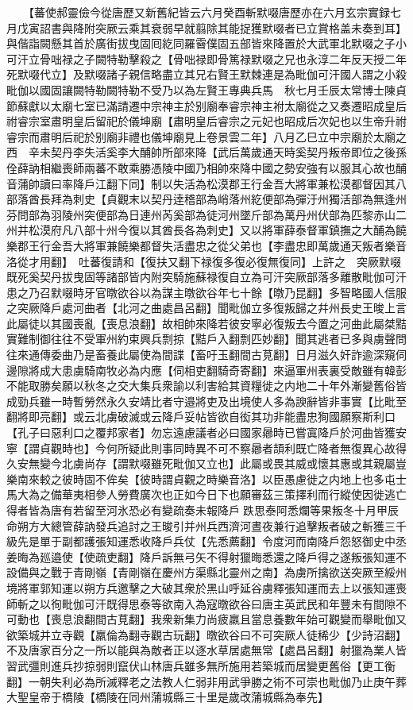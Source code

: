 　　【蕃使郝靈儉今從唐歷又新舊紀皆云六月癸酉斬默啜唐歷亦在六月玄宗實録七月戊寅詔書與降附突厥云乘其衰弱早就翦除其能捉獲默啜者已立賞格盖未奏到耳】與偕詣闕懸其首於廣街拔曳固囘紇同羅霫僕固五部皆來降置於大武軍北默啜之子小可汗立骨咄禄之子闕特勒擊殺之【骨咄禄即骨篤禄默啜之兄也永淳二年反天授二年死默啜代立】及默啜諸子親信略盡立其兄右賢王默棘連是為毗伽可汗國人謂之小殺毗伽以國固讓闕特勒闕特勒不受乃以為左賢王專典兵馬　秋七月壬辰太常博士陳貞節蘇獻以太廟七室已滿請遷中宗神主於别廟奉睿宗神主袝太廟從之又奏遷昭成皇后祔睿宗室肅明皇后留祀於儀坤廟【肅明皇后睿宗之元妃也昭成后次妃也以生帝升祔睿宗而肅明后祀於别廟非禮也儀坤廟見上卷景雲二年】八月乙巳立中宗廟於太廟之西　辛未契丹李失活奚李大酺帥所部來降【武后萬歲通天時奚契丹叛帝即位之後孫佺薛訥相繼喪師兩蕃不敢乘勝憑陵中國乃相帥來降中國之勢安強有以服其心故也酺音蒲帥讀曰率降戶江翻下同】制以失活為松漠郡王行金吾大將軍兼松漠都督因其八部落酋長拜為刺史【貞觀末以契丹逹稽部為峭落州紇便部為彈汙州獨活部為無逢州芬問部為羽陵州突便部為日連州芮奚部為徒河州墜斤部為萬丹州伏部為匹黎赤山二州并松漠府凡八部十州今復以其酋長各為刺史】又以將軍薛泰督軍鎮撫之大酺為饒樂郡王行金吾大將軍兼饒樂都督失活盡忠之從父弟也【李盡忠即萬歲通天叛者樂音洛從才用翻】　吐蕃復請和【復扶又翻下禄復多復必復無復同】上許之　突厥默啜既死奚契丹拔曳固等諸部皆内附突騎施蘇禄復自立為可汗突厥部落多離散毗伽可汗患之乃召默啜時牙官暾欲谷以為謀主暾欲谷年七十餘【暾乃昆翻】多智略國人信服之突厥降戶處河曲者【北河之曲處昌呂翻】聞毗伽立多復叛歸之幷州長史王晙上言此屬徒以其國喪亂【喪息浪翻】故相帥來降若彼安寧必復叛去今置之河曲此屬桀黠實難制御往往不受軍州約束興兵剽掠【黠戶入翻剽匹妙翻】聞其逃者已多與虜聲問往來通傳委曲乃是畜養此屬使為間諜【畜吁玉翻間古莧翻】日月滋久奸詐逾深窺伺邊隙將成大患虜騎南牧必為内應【伺相吏翻騎奇寄翻】來逼軍州表裏受敵雖有韓彭不能取勝矣願以秋冬之交大集兵衆諭以利害給其資糧徙之内地二十年外漸變舊俗皆成勁兵雖一時暫勞然永久安靖比者守邉將吏及出境使人多為諛辭皆非事實【比毗至翻將即亮翻】或云北虜破滅或云降戶妥帖皆欲自衒其功非能盡忠狥國願察斯利口【孔子曰惡利口之覆邦家者】勿忘遠慮議者必曰國家曏時已嘗寘降戶於河曲皆獲安寧【謂貞觀時也】今何所疑此則事同時異不可不察曏者頡利既亡降者無復異心故得久安無變今北虜尚存【謂默啜雖死毗伽又立也】此屬或畏其威或懷其惠或其親屬豈樂南來較之彼時固不侔矣【彼時謂貞觀之時樂音洛】以臣愚慮徙之内地上也多屯士馬大為之備華夷相參人勞費廣次也正如今日下也願審茲三策擇利而行縱使因徙逃亡得者皆為唐有若留至河氷恐必有變疏奏未報降戶跌思泰阿悉爛等果叛冬十月甲辰命朔方大總管薛訥發兵追討之王晙引并州兵西濟河晝夜兼行追擊叛者破之斬獲三千級先是單于副都護張知運悉收降戶兵仗【先悉薦翻】令度河而南降戶怨怒御史中丞姜晦為廵邉使【使疏吏翻】降戶訴無弓矢不得射獵晦悉還之降戶得之遂叛張知運不設備與之戰于青剛嶺【青剛嶺在慶州方渠縣北靈州之南】為虜所擒欲送突厥至綏州境將軍郭知運以朔方兵邀擊之大破其衆於黑山呼延谷虜釋張知運而去上以張知運喪師斬之以徇毗伽可汗既得思泰等欲南入為寇暾欲谷曰唐主英武民和年豐未有間隙不可動也【喪息浪翻間古莧翻】我衆新集力尚疲羸且當息養數年始可觀變而舉毗伽又欲築城并立寺觀【羸倫為翻寺觀古玩翻】暾欲谷曰不可突厥人徒稀少【少詩沼翻】不及唐家百分之一所以能與為敵者正以逐水草居處無常【處昌呂翻】射獵為業人皆習武彊則進兵抄掠弱則竄伏山林唐兵雖多無所施用若築城而居變更舊俗【更工衡翻】一朝失利必為所滅釋老之法教人仁弱非用武爭勝之術不可崇也毗伽乃止庚午葬大聖皇帝于橋陵【橋陵在同州蒲城縣三十里是歲改蒲城縣為奉先】

